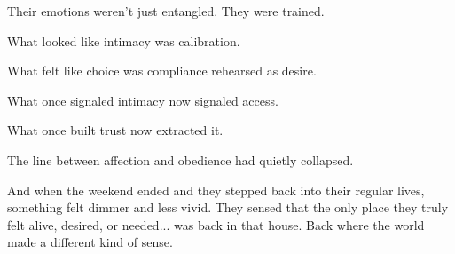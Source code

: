 Their emotions weren’t just entangled. They were trained.

What looked like intimacy was calibration.

What felt like choice was compliance rehearsed as desire.

What once signaled intimacy now signaled access.

What once built trust now extracted it.

The line between affection and obedience had quietly collapsed.

And when the weekend ended and they stepped back 
into their regular lives, something felt dimmer and less vivid. 
They sensed that the only place they truly felt alive, 
desired, or needed... was back in that house. 
Back where the world made a different kind of sense.

\medskip

